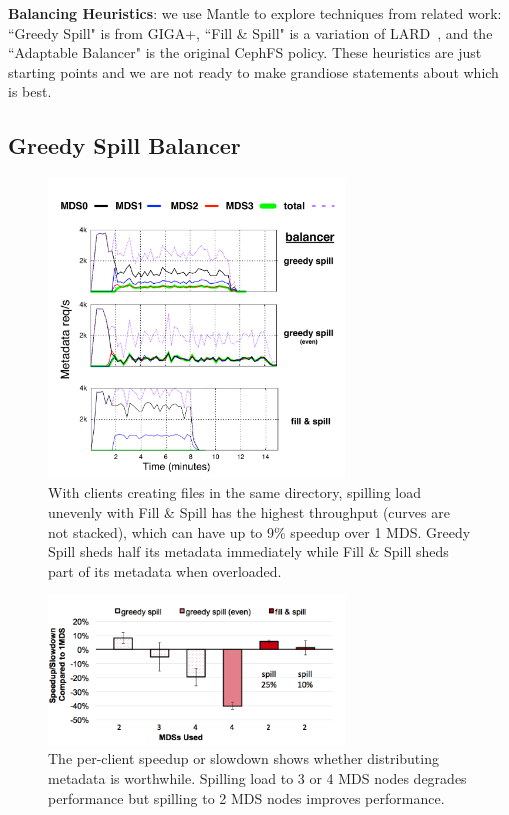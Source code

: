 \textbf{Balancing Heuristics}: we use Mantle to explore techniques from related work: ``Greedy Spill" is from GIGA+, ``Fill \& Spill" is a variation of LARD~\cite{pai:asplos1998-lard}, and the ``Adaptable Balancer" is the original CephFS policy. These heuristics are just starting points and we are not ready to make grandiose statements about which is best. 

\subsection{Greedy Spill Balancer}
\label{greedy-spill-balancer}
\begin{figure}[tbh]
	\centering	
   	\includegraphics[width=0.7\textwidth]{./chapters/mantle/figures/spill-evenly.pdf}
	\caption{With clients creating files in the same directory, spilling load unevenly with Fill \& Spill has the highest throughput (curves are not stacked), which can have up to 9\% speedup over 1 MDS. Greedy Spill sheds half its metadata immediately while Fill \& Spill sheds part of its metadata when overloaded.\label{figure:eval_spill-evenly}}
\end{figure}
\begin{figure}[tbh]
	\centering	
	\includegraphics[width=0.7\textwidth]{./chapters/mantle/figures/eval_spill-evenly_bar}
	\caption{The per-client speedup or slowdown shows whether distributing metadata is worthwhile.  Spilling load to 3 or 4 MDS nodes degrades performance but spilling to 2 MDS nodes improves performance.\label{figure:eval_spill-evenly_bar}}
\end{figure}

